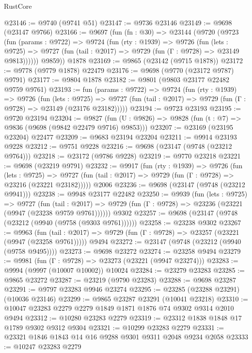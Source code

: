 \begin{lexlean}{RustCore}
\begin{coremodule}
@23146 := @9740 (@9741 @51)
@23147 := @9736 @23146
@23149 := @9698 (@23147 @9766)
@23166 := @9697
    (fun (fn : @30) =>
    @23144
      (@9720
        (@9723
          (fun (params : @9722) =>
          @9724
            (fun (rty : @1939) =>
            @9726
              (fun (lets : @9725) =>
              @9727 (fun (tail : @2017) => @9729 (fun (Γ : @9728) => @23149 @9813))))))
        @9859))
    @1878
@23169 := @9865 (@23142 (@9715 @1878))
@23172 := @9778 (@9779 @1878) @22479
@23176 := @9698 (@9770 (@23172 @9787) @9791)
@23177 := @9804 @1878
@23182 := @9801 (@9803 @23177 @22482 @9759 @9761)
@23193 := fun (params : @9722) =>
  @9724
    (fun (rty : @1939) =>
    @9726
      (fun (lets : @9725) =>
      @9727 (fun (tail : @2017) => @9729 (fun (Γ : @9728) => @23149 (@23176 @23182)))))
@23194 := @9723 @23193
@23195 := @9720 @23194
@23204 := @9827
    (fun (U : @9826) => @9828 (fun (t : @7) => @9836 (@9698 (@9842 @22479 @9716) @9853)))
@23207 := @23169 (@23195 @23204) @22477
@23209 := @9683 @23194 @23204
@23211 := @9914 @23193 @9228
@23212 := @9751 @9228
@23216 := @9698 (@23147 (@9748 (@23212 @9764)))
@23218 := @23172 (@9786 @9228)
@23219 := @9770 @23218
@23221 := @9698 (@23219 @9791)
@23232 := @9917
    (fun (rty : @1939) =>
    @9726
      (fun (lets : @9725) =>
      @9727 (fun (tail : @2017) => @9729 (fun (Γ : @9728) => @23216 (@23221 @23182)))))
    @2006
@23236 := @9698 (@23147 (@9748 (@23212 @9941)))
@23238 := @9948 @23177 @22482
@23250 := @9939
    (fun (lets : @9725) =>
    @9727
      (fun (tail : @2017) =>
      @9729 (fun (Γ : @9728) => @23236 (@23221 (@9947 (@23238 @9759 @9761))))))
    @9302
@23257 := @9698 (@23147 (@9748 (@23212 (@9940 (@9758 (@9303 @9761))))))
@23258 := @23238 @9302
@23267 := @9963
    (fun (tail : @2017) => @9729 (fun (Γ : @9728) => @23257 (@23221 (@9947 (@23258 @9761)))))
    @9494
@23272 := @23147 (@9748 (@23212 (@9940 (@9758 @9495))))
@23273 := @9698 @23272
@23274 := @23258 @9494
@23279 := @9981 (fun (Γ : @9728) => @23273 (@23221 (@9947 @23274)))
@23283 := @9994 (@9997 (@10007 @10002)) @10024
@23284 := @23279 @23283
@23285 := @9865 @23272
@23287 := @23219 (@9790 @23283)
@23288 := @9698 @23287
@23291 := @9797 @23283 @9946 @23274
@23295 := @23285 (@23288 @23291) (@10036 @23146)
@23299 := @9865 @23287 @23291 (@10041 @23218)
@23310 := @10047 @23283 @2279 @2279 @1849 @1871 @1876 @74 @9302 @9314 @2010 @9494
@23312 := @10280 @23283 @2279
@23319 := @23312 @1838 @1848 @17 @1789 @9302 @9312 @9304
@23321 := @10299 @23283 @2279
@23331 := @23321 @1846 @1843 @14 @16 @9288 @9301 @9311 @2048 @9234 @2058
@23333 := @10247 @23283 @2279

\end{coremodule}
\end{lexlean}
